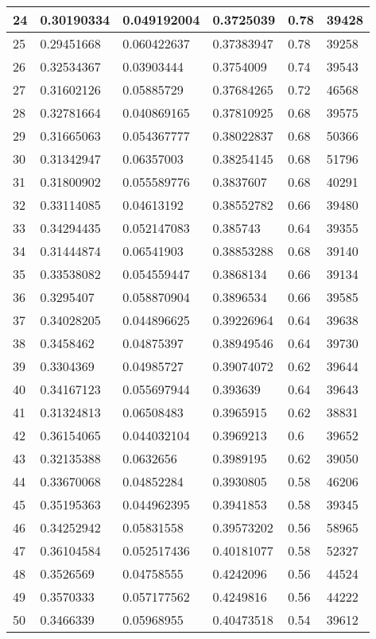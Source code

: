 \begin{longtable}{|l|l|l|l|l|l|}
24 & 0.30190334 & 0.049192004 & 0.3725039 & 0.78 & 39428 \\ \hline 
25 & 0.29451668 & 0.060422637 & 0.37383947 & 0.78 & 39258 \\ \hline 
26 & 0.32534367 & 0.03903444 & 0.3754009 & 0.74 & 39543 \\ \hline 
27 & 0.31602126 & 0.05885729 & 0.37684265 & 0.72 & 46568 \\ \hline 
28 & 0.32781664 & 0.040869165 & 0.37810925 & 0.68 & 39575 \\ \hline 
29 & 0.31665063 & 0.054367777 & 0.38022837 & 0.68 & 50366 \\ \hline 
30 & 0.31342947 & 0.06357003 & 0.38254145 & 0.68 & 51796 \\ \hline 
31 & 0.31800902 & 0.055589776 & 0.3837607 & 0.68 & 40291 \\ \hline 
32 & 0.33114085 & 0.04613192 & 0.38552782 & 0.66 & 39480 \\ \hline 
33 & 0.34294435 & 0.052147083 & 0.385743 & 0.64 & 39355 \\ \hline 
34 & 0.31444874 & 0.06541903 & 0.38853288 & 0.68 & 39140 \\ \hline 
35 & 0.33538082 & 0.054559447 & 0.3868134 & 0.66 & 39134 \\ \hline 
36 & 0.3295407 & 0.058870904 & 0.3896534 & 0.66 & 39585 \\ \hline 
37 & 0.34028205 & 0.044896625 & 0.39226964 & 0.64 & 39638 \\ \hline 
38 & 0.3458462 & 0.04875397 & 0.38949546 & 0.64 & 39730 \\ \hline 
39 & 0.3304369 & 0.04985727 & 0.39074072 & 0.62 & 39644 \\ \hline 
40 & 0.34167123 & 0.055697944 & 0.393639 & 0.64 & 39643 \\ \hline 
41 & 0.31324813 & 0.06508483 & 0.3965915 & 0.62 & 38831 \\ \hline 
42 & 0.36154065 & 0.044032104 & 0.3969213 & 0.6 & 39652 \\ \hline 
43 & 0.32135388 & 0.0632656 & 0.3989195 & 0.62 & 39050 \\ \hline 
44 & 0.33670068 & 0.04852284 & 0.3930805 & 0.58 & 46206 \\ \hline 
45 & 0.35195363 & 0.044962395 & 0.3941853 & 0.58 & 39345 \\ \hline 
46 & 0.34252942 & 0.05831558 & 0.39573202 & 0.56 & 58965 \\ \hline 
47 & 0.36104584 & 0.052517436 & 0.40181077 & 0.58 & 52327 \\ \hline 
48 & 0.3526569 & 0.04758555 & 0.4242096 & 0.56 & 44524 \\ \hline 
49 & 0.3570333 & 0.057177562 & 0.4249816 & 0.56 & 44222 \\ \hline 
50 & 0.3466339 & 0.05968955 & 0.40473518 & 0.54 & 39612 \\ \hline 
\end{longtable}